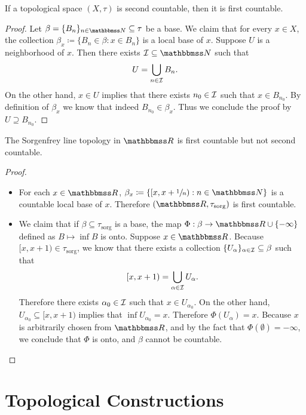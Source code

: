 \documentclass[screen,single]{techreport}
\numberwithin{equation}{section}
\begin{document}
\begin{proposition}\label{Prop:SndAxCountImplyFstAx}
	If a topological space $(X,\tau)$ is second countable, then it is first countable.
\end{proposition}
\begin{proof}
	Let $\beta = \{ B_n\}_{n \in \bbN} \subseteq \tau$ be a base.
	We claim that for every $x \in X$, the collection $\beta_x \coloneqq \{ B_n \in \beta : x \in B_n\}$ is a local base of $x$.
	Suppose $U$ is a neighborhood of $x$. Then there exists $\calI \subseteq \bbN$ such that
	\[
	U = \bigcup_{n \in \mathcal{I}} B_n.
	\]
	On the other hand, $x \in U$ implies that there exists $n_0 \in \mathcal{I}$ such that $x \in B_{n_0}$.
	By definition of $\beta_x$ we know that indeed $B_{n_0} \in \beta_x$.
	Thus we conclude the proof by $U \supseteq B_{n_0}$.
\end{proof}

\begin{proposition}\label{Prop:SorgFstCountNotSnd}
	The Sorgenfrey line topology in $\bbR$ is first countable but not second countable.
\end{proposition}
\begin{proof}\
	\begin{itemize}
		\item For each $x \in \bbR$, $\beta_x \coloneqq \{ [x,x+\sfrac{1}{n}) : n \in \bbN \}$ is a countable local base of $x$. Therefore $(\bbR,\tau_{\mathrm{sorg}})$ is first countable.
		\item We claim that if $\beta \subseteq \tau_{\mathrm{sorg}}$ is a base, the map $\Phi : \beta \to \bbR \cup \{ - \infty \}$ defined as $B \mapsto \inf B$ is onto.
		Suppose $x \in \bbR$.
		Because $[x,x+1) \in \tau_{\mathrm{sorg}}$, we know that there exists a collection $\{ U_\alpha\}_{\alpha \in \mathcal{I}} \subseteq \beta$ such that
		\[
		[x,x+1) = \bigcup_{\alpha \in \mathcal{I}} U_\alpha.
		\]
		Therefore there exists $\alpha_0 \in \mathcal{I}$ such that $x \in U_{\alpha_0}$.
		On the other hand, $U_{\alpha_0} \subseteq [x,x+1)$ implies that $\inf U_{\alpha_0} = x$.
		Therefore $\Phi(U_\alpha) = x$.
		Because $x$ is arbitrarily chosen from $\bbR$, and by the fact that $\Phi(\emptyset) = -\infty$, we conclude that $\Phi$ is onto, and $\beta$ cannot be countable.
	\end{itemize}
\end{proof}

\section{Topological Constructions}
\end{document}
